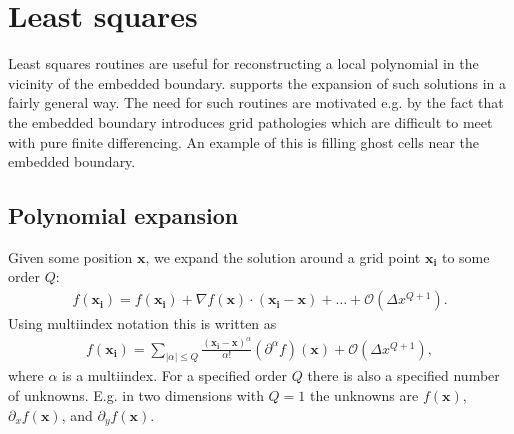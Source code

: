 \documentclass[letterpaper,10pt,english]{sphinxmanual}
\begin{document}
\section{Least squares}
\label{\detokenize{Utilities/LeastSquares:least-squares}}\label{\detokenize{Utilities/LeastSquares:chap-leastsquares}}\label{\detokenize{Utilities/LeastSquares::doc}}
Least squares routines are useful for reconstructing a local polynomial in the vicinity of the embedded boundary.
 supports the expansion of such solutions in a fairly general way.
The need for such routines are motivated e.g. by the fact that the embedded boundary introduces grid pathologies which are difficult to meet with pure finite differencing.
An example of this is filling ghost cells near the embedded boundary.


\subsection{Polynomial expansion}
\label{\detokenize{Utilities/LeastSquares:polynomial-expansion}}
Given some position \(\mathbf{x}\), we expand the solution around a grid point \(\mathbf{x}_{\mathbf{i}}\) to some order \(Q\):
\begin{equation*}
\begin{split}f\left(\mathbf{x}_{\mathbf{i}}\right) = f\left(\mathbf{x}_{\mathbf{i}}\right) + \nabla f\left(\mathbf{x}\right) \cdot \left(\mathbf{x}_{\mathbf{i}} - \mathbf{x}\right) + \ldots + \mathcal{O}\left(\Delta x^{Q+1}\right).\end{split}
\end{equation*}
Using multi\sphinxhyphen{}index notation this is written as
\begin{equation*}
\begin{split}f\left(\mathbf{x}_{\mathbf{i}}\right) = \sum_{|\alpha| \leq Q}\frac{\left(\mathbf{x}_{\mathbf{i}}-\mathbf{x}\right)^\alpha}{\alpha!} \left(\partial^\alpha f\right)\left(\mathbf{x}\right) + \mathcal{O}\left(\Delta x^{Q+1}\right),\end{split}
\end{equation*}
where \(\alpha\) is a multi\sphinxhyphen{}index.
For a specified order \(Q\) there is also a specified number of unknowns.
E.g. in two dimensions with \(Q = 1\) the unknowns are \(f\left(\mathbf{x}\right)\), \(\partial_x f\left(\mathbf{x}\right)\), and \(\partial_y f\left(\mathbf{x}\right)\).
\end{document}
